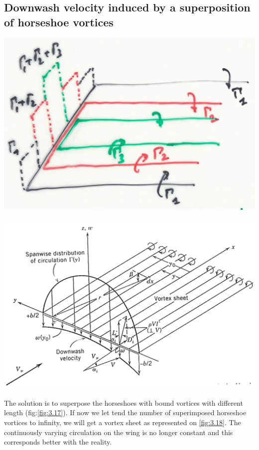 \documentclass[british,french,11pt, a4paper, openany]{article}
\begin{document}
\subsection{Downwash velocity induced by a superposition of horseshoe vortices}
\begin{center}
	\begin{minipage}{0.4\textwidth}
		\includegraphics[scale=0.15]{ch3/17}
		\label{fig:3.17}
	\end{minipage}
	\begin{minipage}{0.4\textwidth}
		\includegraphics[scale=0.12]{ch3/18}
		\label{fig:3.18}
	\end{minipage}
\end{center}

The solution is to superpose the horseshoes with bound vortices with different length (fig:\autoref{fig:3.17}). If now we let tend the number of superimposed horseshoe vortices to infinity, we will get a vortex sheet as represented on \autoref{fig:3.18}. The continuously varying circulation on the wing is no longer constant and this corresponds better with the reality. 
\end{document}
